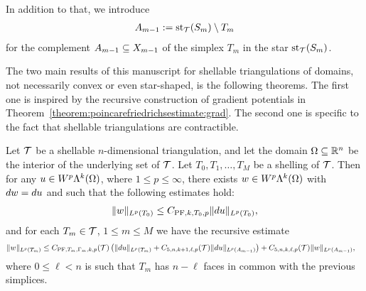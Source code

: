 \documentclass[10pt,a4paper]{article}
\begin{document}
In addition to that, we introduce 
\begin{align*}
    A_{m-1} := \operatorname{st}_{{\mathcal T}}(S_{m}) \setminus T_{m}
\end{align*}
for the complement $A_{m-1} \subseteq X_{m-1}$ of the simplex $T_{m}$ in the star $\operatorname{st}_{{\mathcal T}}(S_{m})$. 

The two main results of this manuscript for shellable triangulations of domains, not necessarily convex or even star-shaped, is the following theorems. 
The first one is inspired by the recursive construction of gradient potentials in Theorem~\ref{theorem:poincarefriedrichsestimate:grad}.
The second one is specific to the fact that shellable triangulations are contractible.




\begin{theorem}\label{theorem:poincarefriedrichsestimate:exterior}
    Let ${\mathcal T}$ be a shellable $n$-dimensional triangulation, and let the domain $\Omega \subseteq {\mathbb R}^{n}$ be the interior of the underlying set of ${\mathcal T}$.
    Let $T_0, T_1, \dots, T_M$ be a shelling of ${\mathcal T}$.
    Then for any $u \in W^{p}\Lambda^{k}(\Omega)$, where $1 \leq p \leq \infty$, 
    there exists $w \in W^{p}\Lambda^{k}(\Omega)$ with $d w = d u$
    and such that the following estimates hold:
    \begin{gather*}
        \| w \|_{L^{p}(T_{0})} \leq C_{{{\rm PF}},k,T_{0},p} \| d u \|_{L^{p}(T_{0})}
        ,
    \end{gather*}
    and for each $T_{m} \in {\mathcal T}$, $1 \leq m \leq M$ we have the recursive estimate 
    \begin{align*}
        \| w \|_{L^{p}(T_{m})}
        &
        \leq  
        C_{{\rm PF},T_{m},\Gamma_{m},k,p}({\mathcal T}) 
        \left( 
            \| d u      \|_{L^{p}(T_{m})} 
            +
            C_{5,n,k+1,\ell,p}({\mathcal T})
            \| d u \|_{L^{p}(A_{m-1})}
        \right)
        + 
        C_{5,n,k,\ell,p}({\mathcal T})
        \| w \|_{L^{p}(A_{m-1})}
        ,
    \end{align*}
    where $0 \leq \ell < n$ is such that $T_{m}$ has $n - \ell$ faces in common with the previous simplices. 
\end{theorem}
\end{document}
